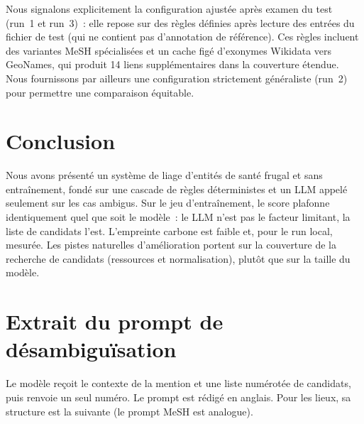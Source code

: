 \documentclass[10pt,twoside]{article}
\begin{document}
Nous signalons explicitement la configuration ajustée après examen du test (run~1 et run~3)~: elle
repose sur des règles définies après lecture des entrées du fichier de test (qui ne contient pas
d'annotation de référence). Ces règles incluent des variantes MeSH spécialisées et un cache figé d'exonymes Wikidata
vers GeoNames, qui produit 14 liens supplémentaires dans la couverture étendue. Nous
fournissons par ailleurs une configuration strictement généraliste (run~2) pour permettre une
comparaison équitable.

\section{Conclusion}
\label{sec:conclusion}

Nous avons présenté un système de liage d'entités de santé frugal et sans entraînement, fondé
sur une cascade de règles déterministes et un LLM appelé seulement sur les
cas ambigus. Sur le jeu d'entraînement, le score plafonne identiquement quel que soit le modèle~: le LLM
n'est pas le facteur limitant, la liste de candidats l'est. L'empreinte carbone est faible et,
pour le run local, mesurée. Les pistes naturelles d'amélioration portent sur la couverture de la
recherche de candidats (ressources et normalisation), plutôt que sur la taille du modèle.





\appendix

\section{Extrait du prompt de désambiguïsation}
\label{ann:prompt}

Le modèle reçoit le contexte de la mention et une liste numérotée de candidats, puis renvoie un
seul numéro. Le prompt est rédigé en anglais. Pour les lieux, sa structure est la suivante (le
prompt MeSH est analogue).
\end{document}
